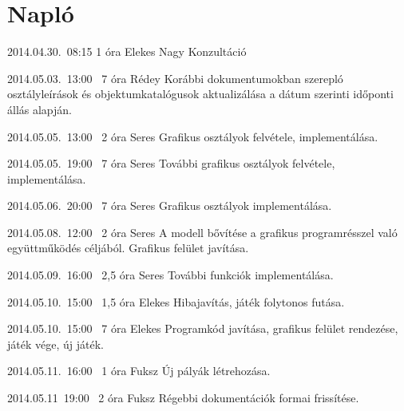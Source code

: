 %
\section{Napló}

\begin{naplo}

\bejegyzes
{2014.04.30.~08:15}
{1 óra}
{Elekes\newline
Nagy}
{Konzultáció}

\bejegyzes
{2014.05.03.~13:00~}
{7 óra}
{Rédey}
{Korábbi dokumentumokban szerepló osztályleírások és objektumkatalógusok aktualizálása a dátum szerinti időponti állás alapján.}

\bejegyzes
{2014.05.05.~13:00~}
{2 óra}
{Seres}
{Grafikus osztályok felvétele, implementálása.}

\bejegyzes
{2014.05.05.~19:00~}
{7 óra}
{Seres}
{További grafikus osztályok felvétele, implementálása.}

\bejegyzes
{2014.05.06.~20:00~}
{7 óra}
{Seres}
{Grafikus osztályok implementálása.}

\bejegyzes
{2014.05.08.~12:00~}
{2 óra}
{Seres}
{A modell bővítése a grafikus programrésszel való együttműködés céljából. Grafikus felület javítása.}

\bejegyzes
{2014.05.09.~16:00~}
{2,5 óra}
{Seres}
{További funkciók implementálása.}

\bejegyzes
{2014.05.10.~15:00~}
{1,5 óra}
{Elekes}
{Hibajavítás, játék folytonos futása.}

\bejegyzes
{2014.05.10.~15:00~}
{7 óra}
{Elekes}
{ Programkód javítása, grafikus felület rendezése, játék vége, új játék. }

\bejegyzes
{2014.05.11.~16:00~}
{1 óra}
{Fuksz}
{Új pályák létrehozása.}

\bejegyzes
{2014.05.11~19:00~}
{2 óra}
{Fuksz}
{Régebbi dokumentációk formai frissítése.}



\end{naplo}

